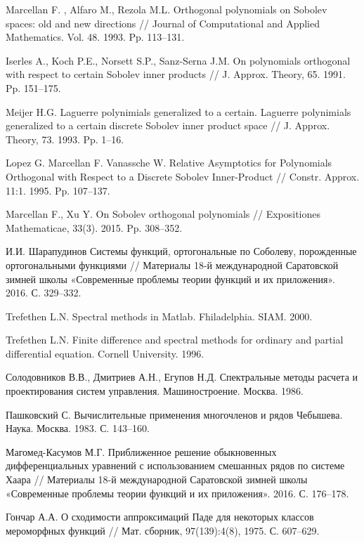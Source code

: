 \begin{thebibliography}{999}
{Marcellan F. , Alfaro M., Rezola M.L.} Orthogonal polynomials on Sobolev spaces: old and new directions
// Journal of Computational and Applied Mathematics. Vol. 48. 1993. Pp. 113--131.

{ Iserles A., Koch P.E., Norsett S.P., Sanz-Serna J.M.}
 On polynomials  orthogonal  with respect  to certain Sobolev inner products
// J. Approx. Theory, 65. 1991. Pp. 151--175.

{Meijer H.G.} Laguerre polynimials generalized to a certain.
Laguerre polynimials generalized to a certain discrete Sobolev inner product space
// J. Approx. Theory, 73. 1993. Pp. 1--16.

{Lopez G. Marcellan F. Vanassche W.}
 Relative Asymptotics for Polynomials Orthogonal with Respect to a Discrete Sobolev Inner-Product
// Constr. Approx. 11:1. 1995. Pp. 107--137.

{Marcellan F., Xu Y.}
 On Sobolev orthogonal polynomials
// Expositiones Mathematicae, 33(3). 2015. Pp. 308--352.

И.И. Шарапудинов
 Системы функций, ортогональные по Соболеву, порожденные ортогональными функциями
// Материалы 18-й международной Саратовской зимней школы «Современные проблемы теории функций и их приложения». 2016. С. 329--332.

{Trefethen  L.N.} Spectral methods in Matlab. Fhiladelphia. SIAM. 2000.

{Trefethen  L.N.}
Finite difference and spectral methods for ordinary and partial differential equation. Cornell University. 1996.

{Солодовников В.В., Дмитриев А.Н., Егупов Н.Д.}
Спектральные методы расчета и проектирования систем управления. Машиностроение. Москва. 1986.

{Пашковский С.} Вычислительные применения многочленов и рядов Чебышева. Наука. Москва. 1983. С. 143--160.

{Магомед-Касумов М.Г.}
 Приближенное решение обыкновенных дифференциальных уравнений с использованием смешанных рядов по системе Хаара
// Материалы 18-й международной Саратовской зимней школы «Современные проблемы теории функций и их приложения». 2016. С. 176--178.

{Гончар А.А.}
 О сходимости аппроксимаций Паде для некоторых классов мероморфных функций
// Мат. сборник, 97(139):4(8), 1975. С. 607--629.


\end{thebibliography}
